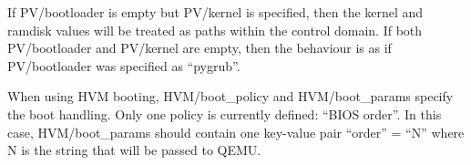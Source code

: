 If PV/bootloader is empty but PV/kernel is specified, then the kernel and ramdisk values will be treated as paths within the control domain.  If both PV/bootloader and PV/kernel are empty, then the behaviour is as if PV/bootloader was specified as ``pygrub''.

When using HVM booting, HVM/boot\_policy and HVM/boot\_params specify the boot handling.  Only one policy is currently defined: ``BIOS order''.  In this case, HVM/boot\_params should contain one key-value pair ``order'' = ``N'' where N is the string that will be passed to QEMU.
